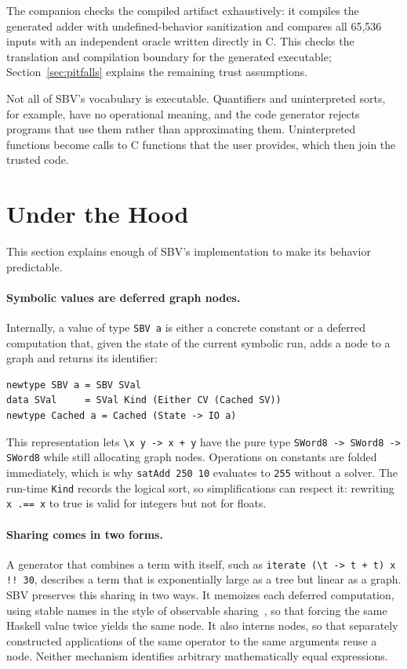 \documentclass[acmsmall,screen,review,anonymous,nonacm]{acmart}
\newcommand{\code}[1]{\texttt{#1}}
\begin{document}
The companion checks the compiled artifact exhaustively: it compiles the
generated adder with undefined-behavior sanitization and compares all 65,536
inputs with an independent oracle written directly in C. This checks the
translation and compilation boundary for the generated executable;
Section~\ref{sec:pitfalls} explains the remaining trust assumptions.

Not all of SBV's vocabulary is executable. Quantifiers and uninterpreted sorts,
for example, have no operational meaning, and the code generator rejects programs
that use them rather than approximating them. Uninterpreted functions become calls
to C functions that the user provides, which then join the trusted code.

\section{Under the Hood}
\label{sec:hood}

This section explains enough of SBV's implementation to make its behavior
predictable.

\paragraph{Symbolic values are deferred graph nodes.}
Internally, a value of type \code{SBV a} is either a concrete constant or a
deferred computation that, given the state of the current symbolic run, adds a
node to a graph and returns its identifier:
\begin{lstlisting}
newtype SBV a = SBV SVal
data SVal     = SVal Kind (Either CV (Cached SV))
newtype Cached a = Cached (State -> IO a)
\end{lstlisting}
This representation lets \code{\textbackslash{}x y -> x + y} have the pure type
\code{SWord8 -> SWord8 -> SWord8} while still allocating graph nodes. Operations
on constants are folded immediately, which is why \code{satAdd 250 10} evaluates
to \code{255} without a solver. The run-time \code{Kind} records the logical sort,
so simplifications can respect it: rewriting \code{x .== x} to true is valid for
integers but not for floats.

\paragraph{Sharing comes in two forms.}
A generator that combines a term with itself, such as
\code{iterate (\textbackslash{}t -> t + t) x !! 30}, describes a term that is
exponentially large as a tree but linear as a graph. SBV preserves this sharing
in two ways. It memoizes each deferred computation, using stable names in the
style of observable sharing~\citep{sharing}, so that forcing the same Haskell
value twice yields the same node. It also interns nodes, so that separately
constructed applications of the same operator to the same arguments reuse a node.
Neither mechanism identifies arbitrary mathematically equal expressions.
\end{document}
